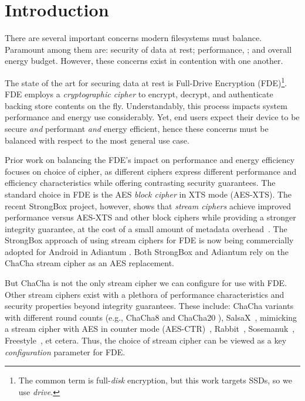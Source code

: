 \section{Introduction}\label{sec:introduction}

There are several important concerns modern filesystems must balance. Paramount
among them are: security of data at rest; performance, ; and overall energy budget. However, these concerns exist in
contention with one another.

The state of the art for securing data at rest is Full-Drive Encryption
(FDE)\footnote{The common term is full-\emph{disk} encryption, but this work
targets SSDs, so we use \emph{drive}.}. FDE employs a \emph{cryptographic
cipher} to encrypt, decrypt, and authenticate backing store contents on the fly.
Understandably, this process impacts system performance and energy use
considerably.  Yet, end users expect their device to be secure
\emph{and} performant \emph{and} energy efficient, hence these concerns must be
balanced with respect to the most general use case.

Prior work on balancing the FDE's impact on performance and energy efficiency
focuses on choice of cipher, as different ciphers express different performance
and efficiency characteristics while offering contrasting security guarantees.
The standard choice in FDE is the AES \emph{block cipher} in XTS mode (AES-XTS).
The recent StrongBox project, however, shows that \emph{stream ciphers} achieve
improved performance versus AES-XTS and other block ciphers while providing a
stronger integrity guarantee, at the cost of a small amount of metadata
overhead~\cite{StrongBox}. The StrongBox approach of using stream ciphers for
FDE is now being commercially adopted for Android in Adiantum \cite{Adiantum}.
Both StrongBox and Adiantum rely on the ChaCha stream cipher as an AES
replacement.


But ChaCha is not the only stream cipher we can configure for use with FDE.
Other stream ciphers exist with a plethora of performance characteristics and
security properties beyond integrity guarantees. These include: ChaCha variants
with different round counts (e.g., ChaCha8 \cite{ChaCha8} and ChaCha20
\cite{ChaCha20}), SalsaX~\cite{SalsaX}, mimicking a stream cipher with AES in
counter mode (AES-CTR)~\cite{AES-CTR}, Rabbit~\cite{Rabbit},
Sosemanuk~\cite{Sosemanuk}, Freestyle~\cite{Freestyle}, et cetera. Thus, the
choice of stream cipher can be viewed as a key \emph{configuration} parameter
for FDE.

